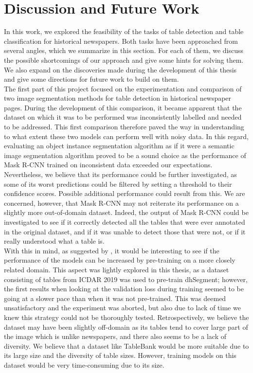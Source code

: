 \chapter{Discussion and Future Work}
\label{conclusion}
In this work, we explored the feasibility of the tasks of table detection and table classification for historical newspapers. Both tasks have been approached from several angles, which we summarize in this section. For each of them, we discuss the possible shortcomings of our approach and give some hints for solving them. We also expand on the discoveries made during the development of this thesis and give some directions for future work to build on them. \\

The first part of this project focused on the experimentation and comparison of two image segmentation methods for table detection in historical newspaper pages. During the development of this comparison, it became apparent that the dataset on which it was to be performed was inconsistently labelled and needed to be addressed. This first comparison therefore paved the way in understanding to what extent these two models can perform well with noisy data. In this regard, evaluating an object instance segmentation algorithm as if it were a semantic image segmentation algorithm proved to be a sound choice as the performance of Mask R-CNN trained on inconsistent data exceeded our expectations. Nevertheless, we believe that its performance could be further investigated, as some of its worst predictions could be filtered by setting a threshold to their confidence scores. Possible additional performance could result from this. We are concerned, however, that Mask R-CNN may not reiterate its performance on a slightly more out-of-domain dataset. Indeed, the output of Mask R-CNN could be investigated to see if it correctly detected all the tables that were ever annotated in the original dataset, and if it was unable to detect those that were not, or if it really understood what a table is.  \\
With this in mind, as suggested by \citet{casado-garcia_benefits_2020}, it would be interesting to see if the performance of the models can be increased by pre-training on a more closely related domain. This aspect was lightly explored in this thesis, as a dataset consisting of tables from ICDAR 2019 \citep{gao_icdar_2019} was used to pre-train dhSegment; however, the first results when looking at the validation loss during training seemed to be going at a slower pace than when it was not pre-trained. This was deemed unsatisfactory and the experiment was aborted, but also due to lack of time we knew this strategy could not be thoroughly tested. Retrospectively, we believe the dataset may have been slightly off-domain as its tables tend to cover large part of the image which is unlike newspapers, and there also seems to be a lack of diversity. We believe that a dataset like TableBank \citep{li_tablebank_2020} would be more suitable due to its large size and the diversity of table sizes. However, training models on this dataset would be very time-consuming due to its size.\\
